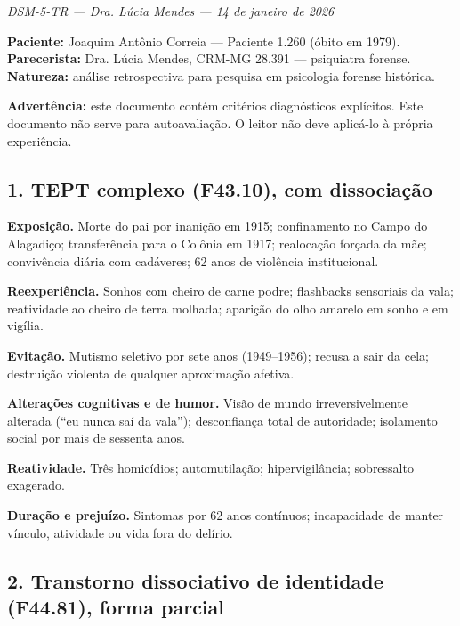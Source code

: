 
\noindent \textit{DSM-5-TR --- Dra. Lúcia Mendes --- 14 de janeiro de 2026}

\noindent \textbf{Paciente:} Joaquim Antônio Correia --- Paciente 1.260 (óbito em 1979). \textbf{Parecerista:} Dra. Lúcia Mendes, CRM-MG 28.391 --- psiquiatra forense. \textbf{Natureza:} análise retrospectiva para pesquisa em psicologia forense histórica.

\noindent \textbf{Advertência:} este documento contém critérios diagnósticos explícitos. Este documento não serve para autoavaliação. O leitor não deve aplicá-lo à própria experiência.

\subsection*{1. TEPT complexo (F43.10), com dissociação}

\noindent \textbf{Exposição.} Morte do pai por inanição em 1915; confinamento no Campo do Alagadiço; transferência para o Colônia em 1917; realocação forçada da mãe; convivência diária com cadáveres; 62 anos de violência institucional.

\noindent \textbf{Reexperiência.} Sonhos com cheiro de carne podre; flashbacks sensoriais da vala; reatividade ao cheiro de terra molhada; aparição do olho amarelo em sonho e em vigília.

\noindent \textbf{Evitação.} Mutismo seletivo por sete anos (1949--1956); recusa a sair da cela; destruição violenta de qualquer aproximação afetiva.

\noindent \textbf{Alterações cognitivas e de humor.} Visão de mundo irreversivelmente alterada (``eu nunca saí da vala''); desconfiança total de autoridade; isolamento social por mais de sessenta anos.

\noindent \textbf{Reatividade.} Três homicídios; automutilação; hipervigilância; sobressalto exagerado.

\noindent \textbf{Duração e prejuízo.} Sintomas por 62 anos contínuos; incapacidade de manter vínculo, atividade ou vida fora do delírio.

\subsection*{2. Transtorno dissociativo de identidade (F44.81), forma parcial}

